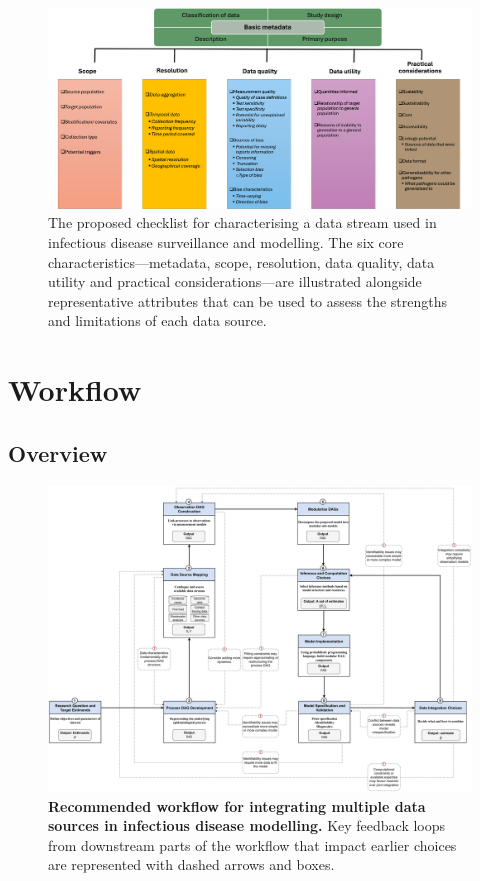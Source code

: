 \documentclass{article}
\begin{document}
\begin{figure}[H] 
\includegraphics[width=1\linewidth]{figures/data_characteristics_2.png}
\centering
\caption{The proposed checklist for characterising a data stream used in infectious disease surveillance and modelling. The six core characteristics---metadata, scope, resolution, data quality, data utility and practical considerations---are illustrated alongside representative attributes that can be used to assess the strengths and limitations of each data source. }
\label{data_characteristics}
\end{figure}


\section{Workflow}
\label{sec:workflow}

\subsection{Overview}


\begin{landscape}
\begin{figure}[htbp]
    \centering
    \includegraphics[width=\textwidth]{figures/restructured_workflow.drawio.pdf}
    \caption{\textbf{Recommended workflow for integrating multiple data sources in infectious disease modelling.} Key feedback loops from downstream parts of the workflow that impact earlier choices are represented with dashed arrows and boxes.}
    \label{fig:workflow}
\end{figure}
\end{landscape}
\end{document}
